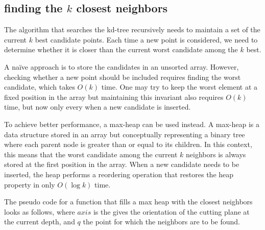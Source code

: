 \documentclass[10pt,a4paper,final]{article}
\begin{document}
\subsection{finding the $k$ closest neighbors}
The algorithm that searches the kd-tree recursively needs to maintain a set of the current $k$ best candidate points. Each time a new point is considered, we need to determine whether it is closer than the current worst candidate among the $k$ best.

A naïve approach is to store the candidates in an unsorted array. However, checking whether a new point should be included requires finding the worst candidate, which takes
$O(k)$ time. One may try to keep the worst element at a fixed position in the array but maintaining this invariant also requires $O(k)$ time, but now only every when a new candidate is inserted.

To achieve better performance, a max-heap can be used instead. A max-heap is a data structure stored in an array but conceptually representing a binary tree where each parent node is greater than or equal to its children. In this context, this means that the  worst candidate among the current $k$ neighbors is always stored at the first position in the array. When a new candidate needs to be inserted, the heap performs a reordering operation that restores the heap property in only $O(\log k)$ time.

The pseudo code for a function that fills a max heap with the closest neighbors looks as follows, where $axis$ is the gives the orientation of the cutting plane at the current depth, and $q$ the point for which the neighbors are to be found.

\begin{algorithm}[H]
\caption{Recursive 3D kNN Search in a KD-tree (Euclidean distance)}
\SetAlgoLined
{}
\end{algorithm} 
\end{document}
